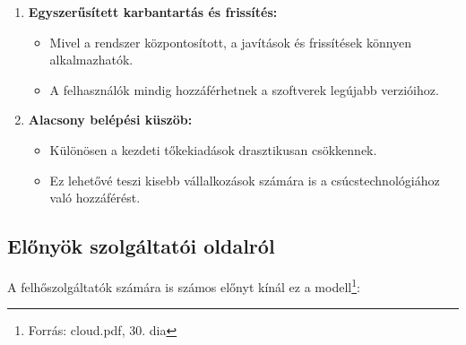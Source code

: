 \documentclass[a4paper,12pt]{article}
\begin{document}
\begin{enumerate}
        \item \textbf{Egyszerűsített karbantartás és frissítés:}
        \begin{itemize}
            \item Mivel a rendszer központosított, a javítások és frissítések könnyen alkalmazhatók.
            \item A felhasználók mindig hozzáférhetnek a szoftverek legújabb verzióihoz.
        \end{itemize}

        \item \textbf{Alacsony belépési küszöb:}
        \begin{itemize}
            \item Különösen a kezdeti tőkekiadások drasztikusan csökkennek.
            \item Ez lehetővé teszi kisebb vállalkozások számára is a csúcstechnológiához való hozzáférést.
        \end{itemize}
    \end{enumerate}

    \subsection{Előnyök szolgáltatói oldalról}

    A felhőszolgáltatók számára is számos előnyt kínál ez a modell\footnote{Forrás: cloud.pdf, 30. dia}:
\end{document}
